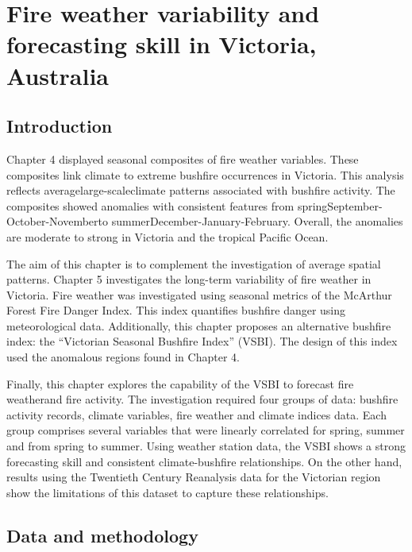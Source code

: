 
\chapter{Fire weather variability and forecasting skill in Victoria, Australia}
\newpage{}


\section{Introduction}

Chapter 4 displayed seasonal composites of fire weather variables.
These composites link climate to extreme bushfire occurrences in Victoria.
This analysis reflects average\textemdash large-scale\textemdash climate
patterns associated with bushfire activity. The composites showed
anomalies with consistent features from spring\textemdash September-October-November\textemdash to
summer\textemdash December-January-February\textemdash . Overall,
the anomalies are moderate to strong in Victoria and the tropical
Pacific Ocean. 

The aim of this chapter is to complement the investigation of average
spatial patterns. Chapter 5 investigates the long-term variability
of fire weather in Victoria. Fire weather was investigated using seasonal
metrics of the McArthur Forest Fire Danger Index. This index quantifies
bushfire danger using meteorological data. Additionally, this chapter
proposes an alternative bushfire index: the \textquotedblleft Victorian
Seasonal Bushfire Index\textquotedblright{} (VSBI). The design of
this index used the anomalous regions found in Chapter 4.

Finally, this chapter explores the capability of the VSBI to forecast
fire weather\textemdash and fire activity\textemdash . The investigation
required four groups of data: bushfire activity records, climate variables,
fire weather and climate indices data. Each group comprises several
variables that were linearly correlated for spring, summer and from
spring to summer. Using weather station data, the VSBI shows a strong
forecasting skill and consistent climate-bushfire relationships. On
the other hand, results using the Twentieth Century Reanalysis data
for the Victorian region show the limitations of this dataset to capture
these relationships. 


\section{Data and methodology}


